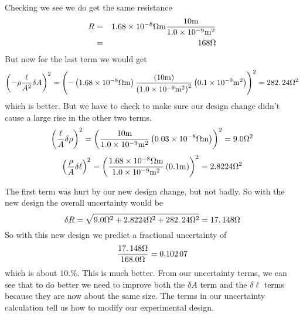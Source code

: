 Checking we see we do get the same resistance 
\begin{eqnarray*}
R &=&1.68\times 10^{-8}\unit{%
\Omega%
}\unit{m}\frac{10\unit{m}}{1.0\times 10^{-9}\unit{m}^{2}} \\
&=&168\unit{%
\Omega%
}
\end{eqnarray*}%
But now for the last term we would get 
\begin{equation*}
\left( -\rho \frac{\ell }{A^{2}}\delta A\right) ^{2}=\left( -\left(
1.68\times 10^{-8}\unit{%
\Omega%
}\unit{m}\right) \frac{\left( 10\unit{m}\right) }{\left( 1.0\times 10^{-9}%
\unit{m}^{2}\right) ^{2}}\left( 0.1\times 10^{-9}\unit{m}^{2}\right) \right)
^{2}=282.\,\allowbreak 24\unit{%
\Omega%
}^{2}
\end{equation*}%
which is better. But we have to check to make sure our design change didn't
cause a large rise in the other two terms. 
\begin{equation*}
\left( \frac{\ell }{A}\delta \rho \right) ^{2}=\left( \frac{10\unit{m}}{%
1.0\times 10^{-9}\unit{m}^{2}}\left( 0.03\times 10^{-8}\unit{%
\Omega%
}\unit{m}\right) \right) ^{2}=9.0\unit{%
\Omega%
}^{2}
\end{equation*}%
\begin{equation*}
\left( \frac{\rho }{A}\delta \ell \right) ^{2}=\left( \frac{1.68\times
10^{-8}\unit{%
\Omega%
}\unit{m}}{1.0\times 10^{-9}\unit{m}^{2}}\left( 0.1\unit{m}\right) \right)
^{2}=2.8224\unit{%
\Omega%
}^{2}
\end{equation*}

The first term was hurt by our new design change, but not badly. So with the
new design the overall uncertainty would be 
\begin{equation*}
\delta R=\sqrt{9.0\unit{%
\Omega%
}^{2}+2.8224\unit{%
\Omega%
}^{2}+282.\,\allowbreak 24\unit{%
\Omega%
}^{2}}=17.\,\allowbreak 148\unit{%
\Omega%
}
\end{equation*}%
$\allowbreak $So with this new design we predict a fractional uncertainty of%
\begin{equation*}
\frac{17.\,\allowbreak 148\unit{%
\Omega%
}}{168.0\unit{%
\Omega%
}}=0.102\,07
\end{equation*}%
which is about $\allowbreak 10.\%.$ This is much better. From our
uncertainty terms, we can see that to do better we need to improve both the $%
\delta A$ term and the $\delta \ell $ terms because they are now about the
same size. The terms in our uncertainty calculation tell us how to modify
our experimental design.


